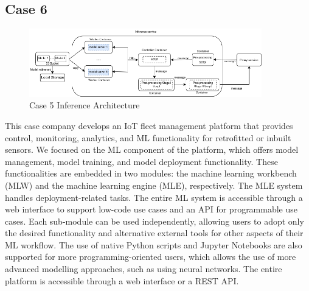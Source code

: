 \subsection*{Case 6} %
\label{case: 6}

\begin{figure}[t]
\centering
\includegraphics[width=0.9\textwidth]{images/case5_deployment_process_v2.png}
\caption{Case 5 Inference Architecture}
\label{fig: case5_deployment_process}
\end{figure}

This case company develops an IoT fleet management platform that provides control, monitoring, analytics, and ML functionality for retrofitted or inbuilt sensors. We focused on the ML component of the platform, which offers model management, model training, and model deployment functionality. These functionalities are embedded in two modules: the machine learning workbench (MLW) and the machine learning engine (MLE), respectively. The MLE system handles deployment-related tasks. The entire ML system is accessible through a web interface to support low-code use cases and an API for programmable use cases. Each sub-module can be used independently, allowing users to adopt only the desired functionality and alternative external tools for other aspects of their ML workflow. The use of native Python scripts and Jupyter Notebooks are also supported for more programming-oriented users, which allows the use of more advanced modelling approaches, such as using neural networks. The entire platform is accessible through a web interface or a REST API. %

